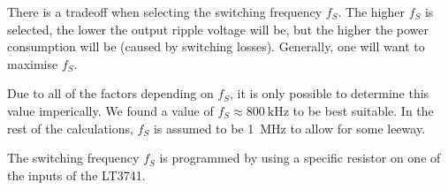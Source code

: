 There is a tradeoff when  selecting  the  switching  frequency $f_S$. The higher
$f_S$ is selected, the  lower  the output ripple voltage will be, but the higher
the power consumption will  be (caused by switching losses). Generally, one will
want to maximise $f_S$.

Due to all  of  the factors depending on $f_S$, it is only possible to determine
this value imperically. We found a value  of  $f_S \approx\SI{800}{\kilo\hertz}$
to be best suitable. In the  rest  of  the  calculations, $f_S$ is assumed to be
\SI{1}{\mega\hertz} to allow for some leeway.

The switching frequency $f_S$ is programmed by using  a specific resistor on one
of the inputs of the LT3741.
